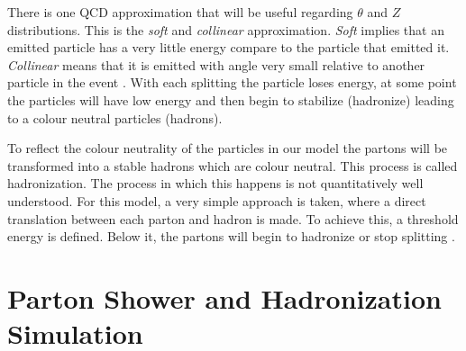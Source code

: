 There is one QCD approximation that will be useful regarding $\theta$ and $Z$ distributions. This is the \textit{soft} and \textit{collinear} approximation. \textit{Soft} implies that an emitted particle has a very little energy compare to the particle that emitted it. \textit{Collinear} means that it is emitted with angle very small relative to another particle in the event \citep{Salam:2010zt}. With each splitting the particle loses energy, at some point the particles will have low energy and then begin to stabilize (hadronize) leading to a colour neutral particles (hadrons).

To reflect the colour neutrality of the particles in our model the partons will be transformed into a stable hadrons which are colour neutral. This process is called hadronization. The process in which this happens is not quantitatively well understood. For this model, a very simple approach is taken, where a direct translation between each parton and hadron is made. To achieve  this, a threshold energy is defined. Below it, the partons will begin to hadronize or stop splitting \citep{Salam:2010zt}. 


\section{Parton Shower and Hadronization Simulation}

